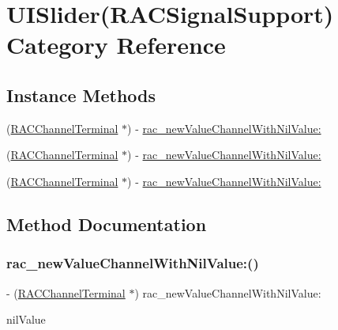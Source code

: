 \hypertarget{category_u_i_slider_07_r_a_c_signal_support_08}{}\section{U\+I\+Slider(R\+A\+C\+Signal\+Support) Category Reference}
\label{category_u_i_slider_07_r_a_c_signal_support_08}
\subsection*{Instance Methods}
\begin{DoxyCompactItemize}
\item 
(\mbox{\hyperlink{interface_r_a_c_channel_terminal}{R\+A\+C\+Channel\+Terminal}} $\ast$) -\/ \mbox{\hyperlink{category_u_i_slider_07_r_a_c_signal_support_08_af2aad34ed73884114a89e932e178afe4}{rac\+\_\+new\+Value\+Channel\+With\+Nil\+Value\+:}}
\item 
(\mbox{\hyperlink{interface_r_a_c_channel_terminal}{R\+A\+C\+Channel\+Terminal}} $\ast$) -\/ \mbox{\hyperlink{category_u_i_slider_07_r_a_c_signal_support_08_af2aad34ed73884114a89e932e178afe4}{rac\+\_\+new\+Value\+Channel\+With\+Nil\+Value\+:}}
\item 
(\mbox{\hyperlink{interface_r_a_c_channel_terminal}{R\+A\+C\+Channel\+Terminal}} $\ast$) -\/ \mbox{\hyperlink{category_u_i_slider_07_r_a_c_signal_support_08_af2aad34ed73884114a89e932e178afe4}{rac\+\_\+new\+Value\+Channel\+With\+Nil\+Value\+:}}
\end{DoxyCompactItemize}


\subsection{Method Documentation}
\mbox{\label{category_u_i_slider_07_r_a_c_signal_support_08_af2aad34ed73884114a89e932e178afe4}} 
\subsubsection{\texorpdfstring{rac\+\_\+new\+Value\+Channel\+With\+Nil\+Value\+:()}{rac\_newValueChannelWithNilValue:()}\hspace{0.1cm}{\footnotesize\ttfamily [1/3]}}
{\footnotesize\ttfamily -\/ (\mbox{\hyperlink{interface_r_a_c_channel_terminal}{R\+A\+C\+Channel\+Terminal}} $\ast$) rac\+\_\+new\+Value\+Channel\+With\+Nil\+Value\+: \begin{DoxyParamCaption}\item[{(N\+S\+Number $\ast$)}]{nil\+Value }\end{DoxyParamCaption}}

